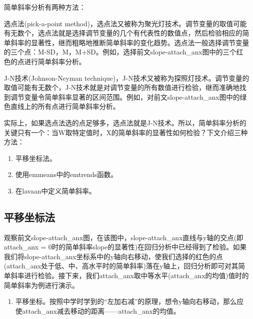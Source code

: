\documentclass[
  chinese-hans,
  letterpaper,
  DIV=11,
  numbers=noendperiod]{scrartcl}
\newenvironment{Shaded}{\begin{snugshade}}{\end{snugshade}}
\newcommand{\AttributeTok}[1]{\textcolor[rgb]{0.40,0.45,0.13}{#1}}
\newcommand{\ConstantTok}[1]{\textcolor[rgb]{0.56,0.35,0.01}{#1}}
\newcommand{\FunctionTok}[1]{\textcolor[rgb]{0.28,0.35,0.67}{#1}}
\newcommand{\NormalTok}[1]{\textcolor[rgb]{0.00,0.23,0.31}{#1}}
\newcommand{\OtherTok}[1]{\textcolor[rgb]{0.00,0.23,0.31}{#1}}
\newcommand{\SpecialCharTok}[1]{\textcolor[rgb]{0.37,0.37,0.37}{#1}}
\providecommand{\tightlist}{%
  \setlength{\itemsep}{0pt}\setlength{\parskip}{0pt}}
\begin{document}
简单斜率分析有两种方法：

选点法(pick-a-point
method)，选点法又被称为聚光灯技术。调节变量的取值可能有无数个，选点法就是选择调节变量的几个有代表性的数值点，然后检验相应的简单斜率的显著性，继而粗略地推断简单斜率的变化趋势。选点法一般选择调节变量的三个点：M-SD，M，M+SD。例如，选择前文slope-attach\_anx图中的三个红色的点进行简单斜率分析。

J-N技术(Johnson-Neyman
technique)，J-N技术又被称为探照灯技术。调节变量的取值可能有无数个，J-N技术就是对调节变量的所有数值进行检验，继而准确地找到调节变量令简单斜率显著的区间范围。例如，对前文slope-attach\_anx图中的绿色直线上的所有点进行简单斜率分析。

实际上，如果选点法选的点足够多，选点法就是J-N技术。所以，简单斜率分析的关键只有一个：当W取特定值时，X的简单斜率的显著性如何检验？下文介绍三种方法：

\begin{enumerate}
\def\labelenumi{\arabic{enumi}.}
\tightlist
\item
  平移坐标法。
\item
  使用emmeans中的emtrends函数。
\item
  在lavaan中定义简单斜率。
\end{enumerate}

\subsection{平移坐标法}\label{ux5e73ux79fbux5750ux6807ux6cd5}

观察前文slope-attach\_anx图，在该图中，slope-attach\_anx直线与y轴的交点(即attach\_anx
=
0时的简单斜率slope的显著性)在回归分析中已经得到了检验。如果我们将slope-attach\_anx坐标系中的y轴向右移动，使我们选择的红色的点(attach\_anx处于低、中、高水平时的简单斜率)落在y轴上，回归分析即可对其简单斜率进行检验。接下来，我们attach\_anx取中等水平(attach\_anx的均值)值时的简单斜率为例进行演示。

\begin{enumerate}
\def\labelenumi{\arabic{enumi}.}
\tightlist
\item
  平移坐标。按照中学时学到的``左加右减''的原理，想令y轴向右移动，那么应使attach\_anx减去移动的距离------attach\_anx的均值。
\end{enumerate}

\begin{Shaded}
\end{Shaded}
\end{document}
